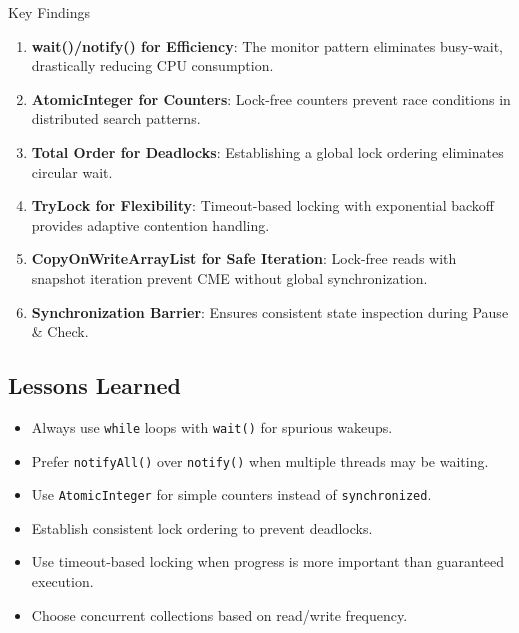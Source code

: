 \documentclass[10pt,a4paper,twocolumn]{article}
\begin{document}
\begin{resultbox}{Key Findings}
\begin{enumerate}
    \item \textbf{wait()/notify() for Efficiency}: The monitor pattern eliminates busy-wait, drastically reducing CPU consumption.
    
    \item \textbf{AtomicInteger for Counters}: Lock-free counters prevent race conditions in distributed search patterns.
    
    \item \textbf{Total Order for Deadlocks}: Establishing a global lock ordering eliminates circular wait.
    
    \item \textbf{TryLock for Flexibility}: Timeout-based locking with exponential backoff provides adaptive contention handling.
    
    \item \textbf{CopyOnWriteArrayList for Safe Iteration}: Lock-free reads with snapshot iteration prevent CME without global synchronization.
    
    \item \textbf{Synchronization Barrier}: Ensures consistent state inspection during Pause \& Check.
\end{enumerate}
\end{resultbox}

\subsection{Lessons Learned}

\begin{itemize}
    \item Always use \texttt{while} loops with \texttt{wait()} for spurious wakeups.
    \item Prefer \texttt{notifyAll()} over \texttt{notify()} when multiple threads may be waiting.
    \item Use \texttt{AtomicInteger} for simple counters instead of \texttt{synchronized}.
    \item Establish consistent lock ordering to prevent deadlocks.
    \item Use timeout-based locking when progress is more important than guaranteed execution.
    \item Choose concurrent collections based on read/write frequency.
\end{itemize}
\end{document}
